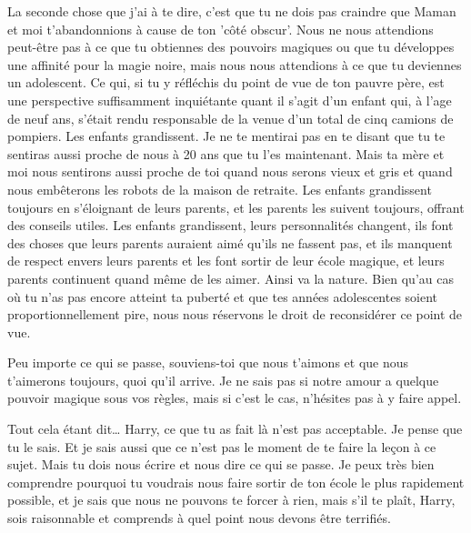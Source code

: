 \begin{writtenNote}
La seconde chose que j'ai à te dire, c'est que tu ne dois pas craindre que Maman et moi t'abandonnions à cause de ton 'côté obscur'. Nous ne nous attendions peut-être pas à ce que tu obtiennes des pouvoirs magiques ou que tu développes une affinité pour la magie noire, mais nous nous attendions à ce que tu deviennes un adolescent. Ce qui, si tu y réfléchis du point de vue de ton pauvre père, est une perspective suffisamment inquiétante quant il s'agit d'un enfant qui, à l'age de neuf ans, s'était rendu responsable de la venue d'un total de cinq camions de pompiers. Les enfants grandissent. Je ne te mentirai pas en te disant que tu te sentiras aussi proche de nous à 20 ans que tu l'es maintenant. Mais ta mère et moi nous sentirons aussi proche de toi quand nous serons vieux et gris et quand nous embêterons les robots de la maison de retraite. Les enfants grandissent toujours en s'éloignant de leurs parents, et les parents les suivent toujours, offrant des conseils utiles. Les enfants grandissent, leurs personnalités changent, ils font des choses que leurs parents auraient aimé qu'ils ne fassent pas, et ils manquent de respect envers leurs parents et les font sortir de leur école magique, et leurs parents continuent quand même de les aimer. Ainsi va la nature. Bien qu'au cas où tu n'as pas encore atteint ta puberté et que tes années adolescentes soient proportionnellement pire, nous nous réservons le droit de reconsidérer ce point de vue.

Peu importe ce qui se passe, souviens-toi que nous t'aimons et que nous t'aimerons toujours, quoi qu'il arrive. Je ne sais pas si notre amour a quelque pouvoir magique sous vos règles, mais si c'est le cas, n'hésites pas à y faire appel.

Tout cela étant dit… Harry, ce que tu as fait là n'est pas acceptable. Je pense que tu le sais. Et je sais aussi que ce n'est pas le moment de te faire la leçon à ce sujet. Mais tu dois nous écrire et nous dire ce qui se passe. Je peux très bien comprendre pourquoi tu voudrais nous faire sortir de ton école le plus rapidement possible, et je sais que nous ne pouvons te forcer à rien, mais s'il te plaît, Harry, sois raisonnable et comprends à quel point nous devons être terrifiés.


\end{writtenNote}

